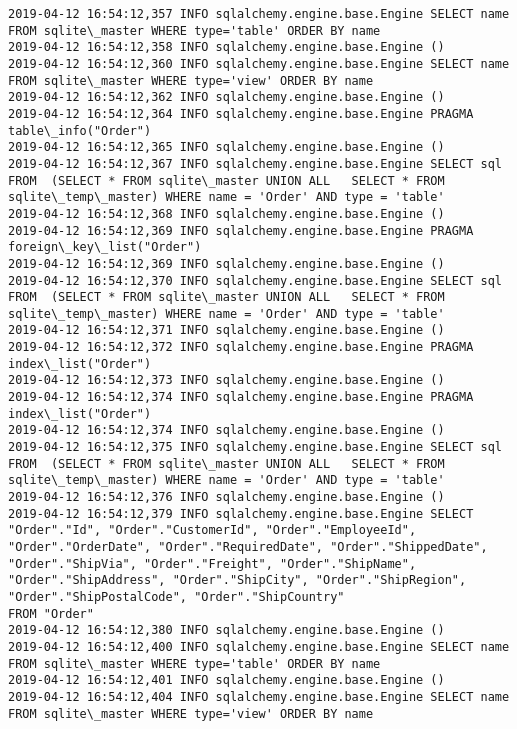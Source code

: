\documentclass[11pt]{article}
\begin{document}
    \begin{Verbatim}[commandchars=\\\{\}]
2019-04-12 16:54:12,357 INFO sqlalchemy.engine.base.Engine SELECT name FROM sqlite\_master WHERE type='table' ORDER BY name
2019-04-12 16:54:12,358 INFO sqlalchemy.engine.base.Engine ()
2019-04-12 16:54:12,360 INFO sqlalchemy.engine.base.Engine SELECT name FROM sqlite\_master WHERE type='view' ORDER BY name
2019-04-12 16:54:12,362 INFO sqlalchemy.engine.base.Engine ()
2019-04-12 16:54:12,364 INFO sqlalchemy.engine.base.Engine PRAGMA table\_info("Order")
2019-04-12 16:54:12,365 INFO sqlalchemy.engine.base.Engine ()
2019-04-12 16:54:12,367 INFO sqlalchemy.engine.base.Engine SELECT sql FROM  (SELECT * FROM sqlite\_master UNION ALL   SELECT * FROM sqlite\_temp\_master) WHERE name = 'Order' AND type = 'table'
2019-04-12 16:54:12,368 INFO sqlalchemy.engine.base.Engine ()
2019-04-12 16:54:12,369 INFO sqlalchemy.engine.base.Engine PRAGMA foreign\_key\_list("Order")
2019-04-12 16:54:12,369 INFO sqlalchemy.engine.base.Engine ()
2019-04-12 16:54:12,370 INFO sqlalchemy.engine.base.Engine SELECT sql FROM  (SELECT * FROM sqlite\_master UNION ALL   SELECT * FROM sqlite\_temp\_master) WHERE name = 'Order' AND type = 'table'
2019-04-12 16:54:12,371 INFO sqlalchemy.engine.base.Engine ()
2019-04-12 16:54:12,372 INFO sqlalchemy.engine.base.Engine PRAGMA index\_list("Order")
2019-04-12 16:54:12,373 INFO sqlalchemy.engine.base.Engine ()
2019-04-12 16:54:12,374 INFO sqlalchemy.engine.base.Engine PRAGMA index\_list("Order")
2019-04-12 16:54:12,374 INFO sqlalchemy.engine.base.Engine ()
2019-04-12 16:54:12,375 INFO sqlalchemy.engine.base.Engine SELECT sql FROM  (SELECT * FROM sqlite\_master UNION ALL   SELECT * FROM sqlite\_temp\_master) WHERE name = 'Order' AND type = 'table'
2019-04-12 16:54:12,376 INFO sqlalchemy.engine.base.Engine ()
2019-04-12 16:54:12,379 INFO sqlalchemy.engine.base.Engine SELECT "Order"."Id", "Order"."CustomerId", "Order"."EmployeeId", "Order"."OrderDate", "Order"."RequiredDate", "Order"."ShippedDate", "Order"."ShipVia", "Order"."Freight", "Order"."ShipName", "Order"."ShipAddress", "Order"."ShipCity", "Order"."ShipRegion", "Order"."ShipPostalCode", "Order"."ShipCountry" 
FROM "Order"
2019-04-12 16:54:12,380 INFO sqlalchemy.engine.base.Engine ()
2019-04-12 16:54:12,400 INFO sqlalchemy.engine.base.Engine SELECT name FROM sqlite\_master WHERE type='table' ORDER BY name
2019-04-12 16:54:12,401 INFO sqlalchemy.engine.base.Engine ()
2019-04-12 16:54:12,404 INFO sqlalchemy.engine.base.Engine SELECT name FROM sqlite\_master WHERE type='view' ORDER BY name

\end{Verbatim}
\end{document}
